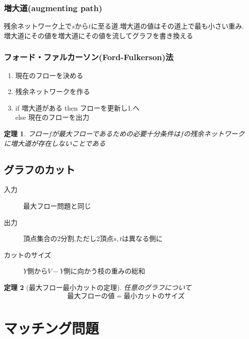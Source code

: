 \documentclass[a4j,10.5pt]{jarticle}
\theoremstyle{break}
\newtheorem{theo}{定理}[section]
\begin{document}
\subsubsection*{増大道(augmenting path)}
残余ネットワーク上で$s$から$t$に至る道.増大道の値はその道上で最も小さい重み.
増大道にその値を増大道にその値を流してグラフを書き換える
\subsubsection*{フォード・ファルカーソン(Ford-Fulkerson)法}
\begin{enumerate}
\item 現在のフローを決める
\item 残余ネットワークを作る
\item if 増大道がある then フローを更新し1.へ \\ else 現在のフローを出力
\end{enumerate}

\begin{theo}
フロー$f$が最大フローであるための必要十分条件は$f$の残余ネットワークに増大道が存在しないことである
\end{theo}

\subsection{グラフのカット}
\begin{description}
\item[入力] 最大フロー問題と同じ
\item[出力] 頂点集合の2分割,ただし2頂点$s,t$は異なる側に
\item[カットのサイズ] $Y$側から$V-Y$側に向かう枝の重みの総和
\end{description}

\begin{theo}[最大フロー最小カットの定理]
任意のグラフについて
\[最大フローの値 = 最小カットのサイズ\]
\end{theo}

\newpage

\section{マッチング問題}
\end{document}
